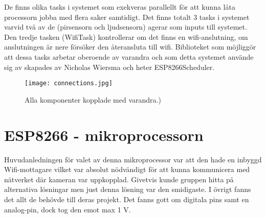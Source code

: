 De finns olika tasks  i systemet som exekveras parallellt för att kunna låta processorn jobba med flera saker samtidigt. Det finns totalt 3 tasks i systemet varvid två av de (pirsensorn och ljudsensorn) agerar som inputs till systemet. Den tredje tasken (WifiTask) kontrollerar om det finns en wifi-anslutning, om anslutningen är nere försöker den återansluta till wifi.
Biblioteket som möjliggör att dessa tasks arbetar oberoende av varandra och som detta systemet använde sig av skapades av Nicholas Wiersma och heter ESP8266Scheduler. 

\begin{figure}[h]

  \texttt{[image: connections.jpg]}
  \caption{Alla komponenter kopplade med varandra.)}
  \label{fig:connections}
\end{figure}



\section{ESP8266 - mikroprocessorn}
Huvudanledningen för valet av denna mikroprocessor var att den hade en inbyggd Wifi-mottagare vilket var absolut nödvändigt för att kunna kommunicera med nätverket där kameran var uppkopplad. Givetvis kunde gruppen hitta på alternativa lösningar men just denna lösning var den smidigaste. I övrigt fanns det allt de behövde till deras projekt. Det fanns gott om digitala pins samt en analog-pin, dock tog den emot max 1 V. \\

